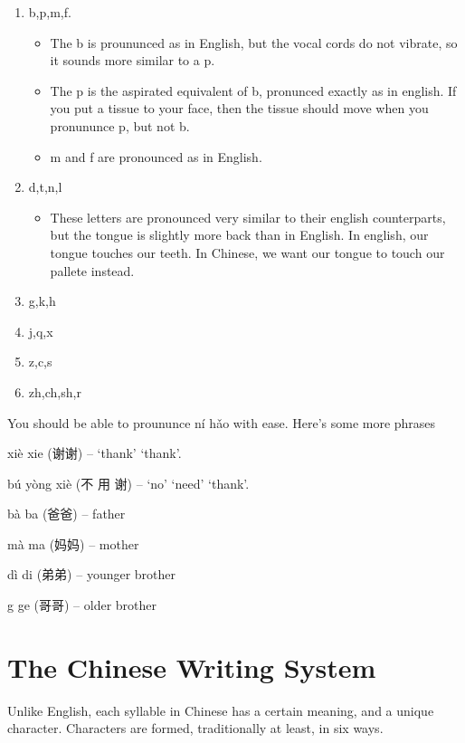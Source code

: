 \documentclass{article}
\begin{document}
\begin{enumerate}
    \item b,p,m,f.
    \begin{itemize}
        \item The b is proununced as in English, but the vocal cords do not vibrate, so it sounds more similar to a p.
        \item The p is the aspirated equivalent of b, pronunced exactly as in english. If you put a tissue to your face, then the tissue should move when you pronununce p, but not b.
        \item m and f are pronounced as in English.
    \end{itemize}

    \item d,t,n,l
    \begin{itemize}
        \item These letters are pronounced very similar to their english counterparts, but the tongue is slightly more back than in English. In english, our tongue touches our teeth. In Chinese, we want our tongue to touch our pallete instead.
    \end{itemize}

    \item g,k,h


    \item j,q,x
    \item z,c,s
    \item zh,ch,sh,r
\end{enumerate}

You should be able to proununce n\'{i} h\v{a}o with ease. Here's some more phrases
%
\begin{center}
    xi\`{e} xie (谢谢) -- `thank' `thank'.

    b\'{u} y\`{o}ng xi\`{e} (不 用 谢) -- `no' `need' `thank'.

    b\`{a} ba (爸爸) -- father

    m\`{a} ma (妈妈) -- mother

    d\`{i} di (弟弟) -- younger brother

    g ge (哥哥) -- older brother
\end{center}

\section{The Chinese Writing System}

Unlike English, each syllable in Chinese has a certain meaning, and a unique character. Characters are formed, traditionally at least, in six ways.
\end{document}
